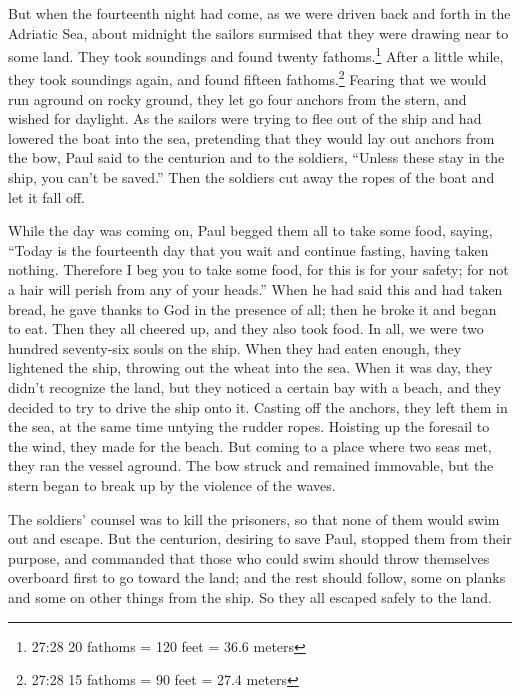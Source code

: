 \myverse{}But when the fourteenth night had come, as we were driven back
and forth in the Adriatic Sea, about midnight the sailors surmised that they were drawing near to some
land.
\myverse{}They took soundings and found twenty fathoms.\footnote{27:28 20 fathoms = 120 feet = 36.6 meters} After a little while, they took soundings again,
and found fifteen fathoms.\footnote{27:28 15 fathoms = 90 feet = 27.4 meters}
\myverse{}Fearing that we would run aground on rocky ground, they let go four anchors
from the stern, and wished for daylight.
\myverse{}As the sailors were trying to flee out of the ship and had lowered the boat
into the sea, pretending that they would lay out anchors from the bow,
\myverse{}Paul said to the centurion and to the soldiers, “Unless these stay in the
ship, you can’t be saved.”
\myverse{}Then the soldiers cut away the ropes of the boat and let it fall off.

\myverse{}While the day was coming on, Paul begged them all to take some
food, saying, “Today is the fourteenth day that you wait and continue fasting, having taken nothing.
\myverse{}Therefore I beg you to take some food, for this is for your safety; for not
a hair will perish from any of your heads.”
\myverse{}When he had said this and had taken bread, he gave thanks to God in the presence
of all; then he broke it and began to eat.
\myverse{}Then they all cheered up, and they also took food.
\myverse{}In all, we were two hundred seventy-six souls on the ship.
\myverse{}When they had eaten enough, they lightened the ship, throwing out the wheat
into the sea.
\myverse{}When it was day, they didn’t recognize the land, but they noticed a certain
bay with a beach, and they decided to try to drive the ship onto it.
\myverse{}Casting off the anchors, they left them in the sea, at the same time untying
the rudder ropes. Hoisting up the foresail to the wind, they made for the beach.
\myverse{}But coming to a place where two seas met, they ran the vessel aground. The
bow struck and remained immovable, but the stern began to break up by the violence of the waves.

\myverse{}The soldiers’ counsel was to kill the prisoners, so that none
of them would swim out and escape.
\myverse{}But the centurion, desiring to save Paul, stopped them from their purpose,
and commanded that those who could swim should throw themselves overboard first to go toward the land;
\myverse{}and the rest should follow, some on planks and some on other things from
the ship. So they all escaped safely to the land.


